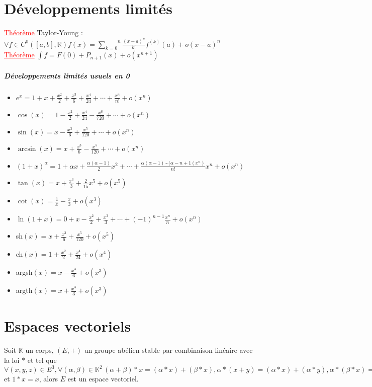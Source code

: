 \documentclass[a4paper, french]{article}
\newcommand{\R}{\mathbb{R}}
\newcommand{\K}{\mathbb{K}}
\newcommand{\al}{\alpha}
\newcommand{\be}{\beta}
\newcommand{\som}[2]{\overset{#2}{\underset{#1}{\sum}}}
\newcommand{\thm}{\textcolor{red}{\underline{Théorème} }}
\newcommand{\inv}[1]{\frac{1}{#1}}
\begin{document}
	\section{Développements limités}
	 \thm Taylor-Young : $\forall f \in C^0([a,b],\R) f(x)=\som{k=0}{n}\frac{(x-a)^k}{k!}f^{(k)}(a)+o(x-a)^n$ \\
	 \thm $\int f=F(0)+P_{n+1}(x)+o(x^{n+1})$
	\subparagraph{Développements limités usuels en 0}
	\begin{itemize}
	  \item $e^x=1+x+\frac{x^2}{2}+\frac{x^3}{6}+\frac{x^4}{24}+\cdots+\frac{x^n}{n!}+o(x^n)$
	  \item $\cos(x)=1-\frac{x^2}{2}+\frac{x^4}{24}-\frac{x^6}{720}+\cdots+o(x^n)$
	  \item $\sin(x)=x-\frac{x^3}{6}+\frac{x^5}{120}+\cdots+o(x^n)$
	  \item $\arcsin(x)=x+\frac{x^3}{6}-\frac{x^5}{120}+\cdots+o(x^n)$
	  \item $(1+x)^\al=1+\al x+\frac{\al(\al-1)}{2}x^2+\cdots+ \frac{\al(\al-1)\cdots(\al-n+1(x^n)}{n!}x^n+o(x^n)$
	  \item $\tan(x)=x+\frac{x^3}{3}+\frac{2}{15}x^5+o(x^5)$
	  \item $\cot(x)=\inv{x}-\frac{x}{3}+o(x^3)$
	  \item $\ln(1+x)=0+x-\frac{x^2}{2}+\frac{x^3}{3}+\cdots+(-1)^{n-1}\frac{x^{n}}{n}+o(x^n)$
	  \item sh$(x)=x+\frac{x^3}{6}+\frac{x^5}{120}+o(x^5)$
	  \item ch$(x)=1+\frac{x^2}{2}+\frac{x^4}{24}+o(x^4)$
	  \item argsh$(x)=x-\frac{x^3}{6}+o(x^3)$
	  \item argth$(x)=x+\frac{x^3}{3}+o(x^3)$
	\end{itemize}

	\section{Espaces vectoriels}
	Soit $\K$ un corps, $(E,+)$ un groupe abélien stable par combinaison linéaire avec la loi $*$ et tel que $\forall (x,y,z)\in E^3,\forall (\al,\be) \in \K^2 \, (\al+\be)*x=(\al*x)+(\be*x), \al*(x+y)=(\al*x)+(\al*y), \al*(\be*x)=(\al  \be)*x$ et $1*x=x$, alors $E$ est un espace vectoriel.
\end{document}
